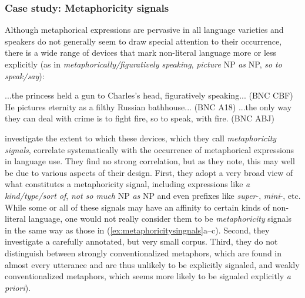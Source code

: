 \subsubsection{Case study: Metaphoricity signals}
\label{sec:metaphoricitysignals}

Although metaphorical  expressions are pervasive in all language varieties  and speakers do not generally seem to draw special attention to their occurrence, there is a wide range of devices that mark non\hyp{}literal language more or less explicitly (as in \textit{metaphorically\slash figuratively speaking}, \textit{picture} NP \textit{as} NP, \textit{so to speak\slash say}):

\begin{exe}
\ex
\begin{xlist}
\label{ex:metaphoricitysingnals}
\ex ...the princess held a gun to Charles's head, figuratively speaking... (BNC CBF)
\ex He pictures eternity as a filthy Russian bathhouse... (BNC A18)
\ex ...the only way they can deal with crime is to fight fire, so to speak, with fire. (BNC ABJ)
\end{xlist}
\end{exe}

\citet{wallington_metaphoricity_2003} investigate the extent to which these devices, which they call \textit{metaphoricity signals}, correlate  systematically with the occurrence of metaphorical  expressions in language use. They find no strong correlation, but as they note, this may well be due to various aspects of their design.  First, they adopt a very broad view of what constitutes a metaphoricity  signal, including expressions like \textit{a kind\slash type\slash sort of}, \textit{not so much} NP \textit{as} NP and even prefixes  like \textit{super}-, \textit{mini}-, etc. While some or all of these signals may have an affinity to certain kinds of non\hyp{}literal language, one would not really consider them to be \textit{metaphoricity} signals in the same way as those in (\ref{ex:metaphoricitysingnals}a--c). Second, they investigate a carefully annotated,  but very small corpus. Third, they do not distinguish between strongly conventionalized  metaphors,  which are found in almost every utterance and are thus unlikely to be explicitly signaled, and weakly conventionalized metaphors, which seems more likely to be signaled explicitly \textit{a priori}).

